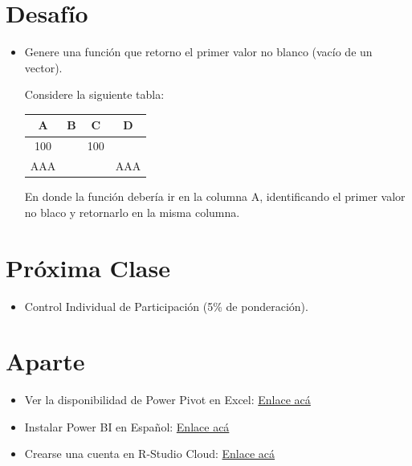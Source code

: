 \documentclass[12 pt,letterpaper]{article}
\begin{document}
\section{Desafío \faWarning}

\begin{itemize}
	\item Genere una función que retorno el primer valor no blanco (vacío de un vector). 
	
	Considere la siguiente tabla:
	
	\begin{center}
	\begin{tabular}{|c|c|c|c|}
		\hline
		A & B & C & D \\
		\hline
		100 &  & 100 &  \\
		\hline
		AAA &  &  & AAA \\
		\hline
	\end{tabular}
	\end{center}
	
	En donde la función debería ir en la columna A, identificando el primer valor no blaco y retornarlo en la misma columna. 
	
\end{itemize}

\section{Próxima Clase}

\begin{itemize}
	\item Control Individual de Participación (5\% de ponderación).
\end{itemize}

\section{Aparte}

\begin{itemize}
	\item Ver la disponibilidad de Power Pivot en Excel: \href{https://support.microsoft.com/es-es/office/iniciar-el-complemento-power-pivot-para-excel-a891a66d-36e3-43fc-81e8-fc4798f39ea8}{Enlace acá}	
	
	\item Instalar Power BI en Español: \href{https://powerbi.microsoft.com/es-es/desktop/}{Enlace acá}
	
	\item Crearse una cuenta en R-Studio Cloud: \href{https://rstudio.cloud/}{Enlace acá}
		
\end{itemize}
\end{document}
